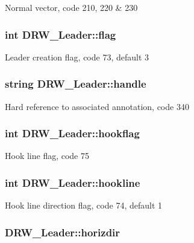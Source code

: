 Normal vector, code 210, 220 \& 230 \hypertarget{classDRW__Leader_adcf19e8f9d127c910267e37a9d09e828}{
\subsubsection[{flag}]{\setlength{\rightskip}{0pt plus 5cm}int D\-R\-W\-\_\-\-Leader\-::flag}}\label{classDRW__Leader_adcf19e8f9d127c910267e37a9d09e828}
Leader creation flag, code 73, default 3 \hypertarget{classDRW__Leader_a888e422223a71784801bc1c0d54578c1}{
\subsubsection[{handle}]{\setlength{\rightskip}{0pt plus 5cm}string D\-R\-W\-\_\-\-Leader\-::handle}}\label{classDRW__Leader_a888e422223a71784801bc1c0d54578c1}
Hard reference to associated annotation, code 340 \hypertarget{classDRW__Leader_a5d47804340900202fe3d1cd7bebbcecf}{
\subsubsection[{hookflag}]{\setlength{\rightskip}{0pt plus 5cm}int D\-R\-W\-\_\-\-Leader\-::hookflag}}\label{classDRW__Leader_a5d47804340900202fe3d1cd7bebbcecf}
Hook line flag, code 75 \hypertarget{classDRW__Leader_a80aca0277cc06cbcb4af9c6a42decf06}{
\subsubsection[{hookline}]{\setlength{\rightskip}{0pt plus 5cm}int D\-R\-W\-\_\-\-Leader\-::hookline}}\label{classDRW__Leader_a80aca0277cc06cbcb4af9c6a42decf06}
Hook line direction flag, code 74, default 1 \hypertarget{classDRW__Leader_a31292925946b20b3c24f679c54f83523}{
\subsubsection[{horizdir}]{ D\-R\-W\-\_\-\-Leader\-::horizdir}}\label{classDRW__Leader_a31292925946b20b3c24f679c54f83523}
